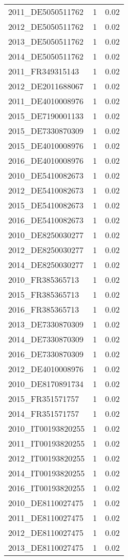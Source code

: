 \begin{table*}[htbp]
\begin{tabular}{lrr}
2011_DE5050511762 & 1 & 0.02 \\
2012_DE5050511762 & 1 & 0.02 \\
2013_DE5050511762 & 1 & 0.02 \\
2014_DE5050511762 & 1 & 0.02 \\
2011_FR349315143 & 1 & 0.02 \\
2012_DE2011688067 & 1 & 0.02 \\
2011_DE4010008976 & 1 & 0.02 \\
2015_DE7190001133 & 1 & 0.02 \\
2015_DE7330870309 & 1 & 0.02 \\
2015_DE4010008976 & 1 & 0.02 \\
2016_DE4010008976 & 1 & 0.02 \\
2010_DE5410082673 & 1 & 0.02 \\
2012_DE5410082673 & 1 & 0.02 \\
2015_DE5410082673 & 1 & 0.02 \\
2016_DE5410082673 & 1 & 0.02 \\
2010_DE8250030277 & 1 & 0.02 \\
2012_DE8250030277 & 1 & 0.02 \\
2014_DE8250030277 & 1 & 0.02 \\
2010_FR385365713 & 1 & 0.02 \\
2015_FR385365713 & 1 & 0.02 \\
2016_FR385365713 & 1 & 0.02 \\
2013_DE7330870309 & 1 & 0.02 \\
2014_DE7330870309 & 1 & 0.02 \\
2016_DE7330870309 & 1 & 0.02 \\
2012_DE4010008976 & 1 & 0.02 \\
2010_DE8170891734 & 1 & 0.02 \\
2015_FR351571757 & 1 & 0.02 \\
2014_FR351571757 & 1 & 0.02 \\
2010_IT00193820255 & 1 & 0.02 \\
2011_IT00193820255 & 1 & 0.02 \\
2012_IT00193820255 & 1 & 0.02 \\
2014_IT00193820255 & 1 & 0.02 \\
2016_IT00193820255 & 1 & 0.02 \\
2010_DE8110027475 & 1 & 0.02 \\
2011_DE8110027475 & 1 & 0.02 \\
2012_DE8110027475 & 1 & 0.02 \\
2013_DE8110027475 & 1 & 0.02 \\

\end{tabular}
\end{table*}
